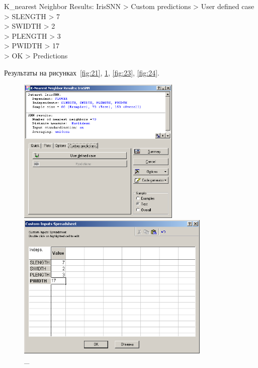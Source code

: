 K\_nearest Neighbor Results: IrisSNN > Custom predictions > User defined case \\
> SLENGTH > 7 \\
> SWIDTH > 2 \\
> PLENGTH > 3 \\
> PWIDTH > 17 \\
> OK > Predictions

Результаты на рисунках~\ref{fig:21}, \ref{fig:22}, \ref{fig:23}, \ref{fig:24}.

\begin{figure}[!h]
  \centering

  \begin{minipage}{0.49\textwidth}
    \centering

    \includegraphics[height=7cm]
    {inc/ex_28.PNG}

    \caption{\_}

    \label{fig:21}
  \end{minipage}
  \begin{minipage}{0.49\textwidth}
    \centering

    \includegraphics[height=7cm]
    {inc/ex_29.PNG}

    \caption{\_}

    \label{fig:22}
  \end{minipage}
\end{figure}

